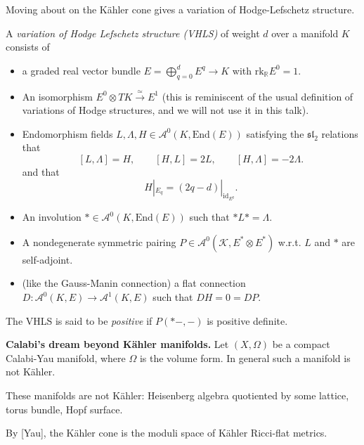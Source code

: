 \noindent
Moving about on the Kähler cone gives 
a variation of Hodge-Lefschetz structure.

\begin{definition}
\label{definition-variation-of-hodge-lefschetz-structure}
A {\it variation of Hodge Lefschetz structure (VHLS)} 
of weight $d$ over a manifold $K$ consists of
\begin{itemize}
\item a graded real vector bundle
$E=\bigoplus_{q=0}^d E^q \to K$
with $\text{rk}_\mathbb{R}E^0=1$.

\item An isomorphism $E^0 \otimes TK \xrightarrow{\simeq}E^1$
(this is reminiscent of the usual definition
of variations of Hodge structures, and 
we will not use it in this talk).

\item Endomorphism fields
$L, \Lambda,H \in \mathcal{A}^0(K,\text{End}(E))$
satisfying the $\mathfrak{sl}_2$ relations
that
$$
[L,\Lambda]=H,\qquad [H,L]=2L,\qquad [H,\Lambda]=-2\Lambda.
$$
and that
$$
H|_{E_q}=(2q-d)|_{\text{id}_{E^q}}.
$$
\item An involution $* \in \mathcal{A}^0(K,\text{End}(E))$
such that $* L *=\Lambda$.

\item A nondegenerate symmetric pairing
$P \in \mathcal{A}^0(\mathcal{K},E^* \otimes E^*)$
w.r.t. $L$ and $*$ are self-adjoint.

\item (like the Gauss-Manin connection)
a flat connection $D: \mathcal{A}^0(K,E)\to\mathcal{A}^1(K,E)$
such that $DH=0=DP$.
\end{itemize}
The VHLS is said to be {\it positive} if $P(*-,-)$ 
is positive definite.
\end{definition}

\noindent
{\bf Calabi's dream beyond Kähler manifolds.}
Let $(X,\Omega)$ be a compact Calabi-Yau manifold,
where $\Omega$ is the volume form.
In general such a manifold is not Kähler.

\begin{example}
\label{example-non-kahler}
These manifolds are not Kähler:
Heisenberg algebra quotiented by some lattice,
torus bundle, Hopf surface.
\end{example}

\noindent
By [Yau], the Kähler cone is the moduli
space of Kähler Ricci-flat metrics.

